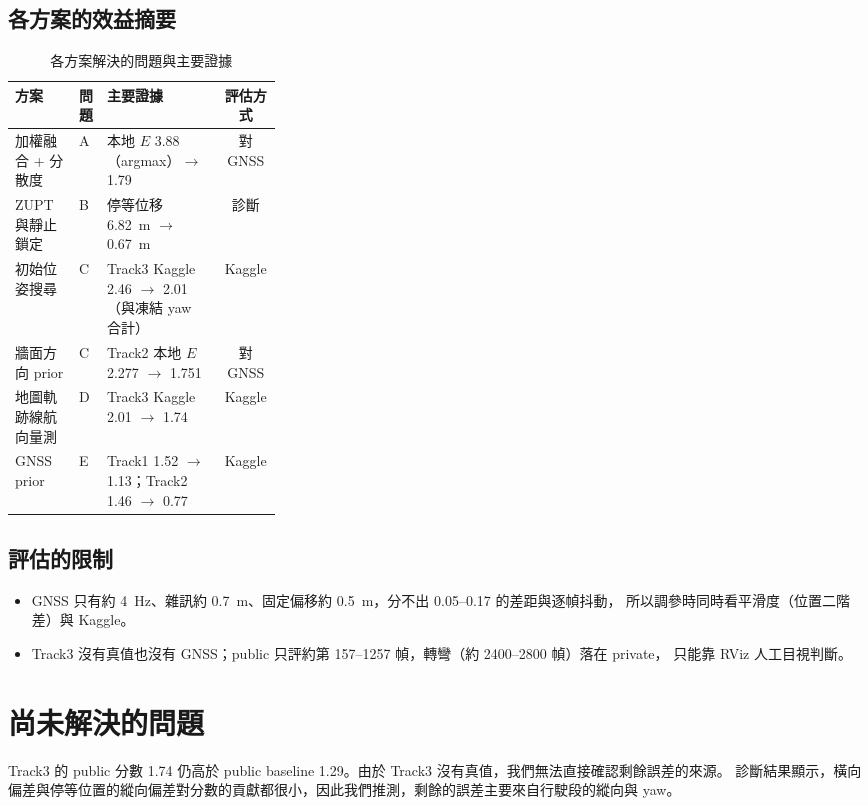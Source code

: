 \documentclass[11pt, a4paper]{article}
\begin{document}
\subsection{各方案的效益摘要}
\begin{table}[H]
\centering\small
\caption{各方案解決的問題與主要證據}\label{tab:benefit}
\begin{tabularx}{\linewidth}{@{}>{\raggedright\arraybackslash}p{0.24\linewidth}>{\raggedright\arraybackslash}p{0.07\linewidth}Yc@{}}
\toprule
方案 & 問題 & 主要證據 & 評估方式\\
\midrule
加權融合 + 分散度 & A & 本地 $E$ 3.88（argmax）$\to$ 1.79 & 對 GNSS\\
ZUPT 與靜止鎖定 & B & 停等位移 6.82~m $\to$ 0.67~m & 診斷\\
初始位姿搜尋 & C & Track3 Kaggle 2.46 $\to$ 2.01（與凍結 yaw 合計） & Kaggle\\
牆面方向 prior & C & Track2 本地 $E$ 2.277 $\to$ 1.751 & 對 GNSS\\
地圖軌跡線航向量測 & D & Track3 Kaggle 2.01 $\to$ 1.74 & Kaggle\\
GNSS prior & E & Track1 1.52 $\to$ 1.13；Track2 1.46 $\to$ 0.77 & Kaggle\\
\bottomrule
\end{tabularx}
\end{table}

\subsection{評估的限制}
\begin{itemize}
  \item GNSS 只有約 4~Hz、雜訊約 0.7~m、固定偏移約 0.5~m，分不出 0.05--0.17 的差距與逐幀抖動，
        所以調參時同時看平滑度（位置二階差）與 Kaggle。
  \item Track3 沒有真值也沒有 GNSS；public 只評約第 157--1257 幀，轉彎（約 2400--2800 幀）落在 private，
        只能靠 RViz 人工目視判斷。
\end{itemize}

\section{尚未解決的問題}
Track3 的 public 分數 1.74 仍高於 public baseline 1.29。由於 Track3 沒有真值，我們無法直接確認剩餘誤差的來源。
診斷結果顯示，橫向偏差與停等位置的縱向偏差對分數的貢獻都很小，因此我們推測，剩餘的誤差主要來自行駛段的縱向與 yaw。
\end{document}
